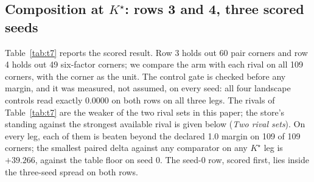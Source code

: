 \documentclass{article} %
\newcommand{\Kstar}{\ensuremath{K^{\star}}}
\begin{document}
\subsection{Composition at $\Kstar$: rows 3 and 4, three scored seeds}
\label{sec:shapes-t7}

Table~\ref{tab:t7} reports the scored result. Row 3 holds out 60 pair corners and row 4 holds
out 49 six-factor corners; we compare the arm with each rival on all 109 corners, with the corner
as the unit. %
The control gate is checked before any margin, and it was measured, not assumed, on every seed:
all four landscape controls read exactly 0.0000 on both rows on all three legs.
The rivals of Table~\ref{tab:t7} are the weaker of the two rival sets in this paper; the
store's standing against the strongest available rival is given below (\emph{Two rival sets}).
On every leg, each of them is beaten beyond the declared 1.0 margin on 109 of 109 corners; the
smallest paired delta against any comparator on any $\Kstar$ leg is $+39.266$, against the
table floor on seed 0. %
The seed-0 row, scored first, lies inside the three-seed spread on both rows.
\end{document}
